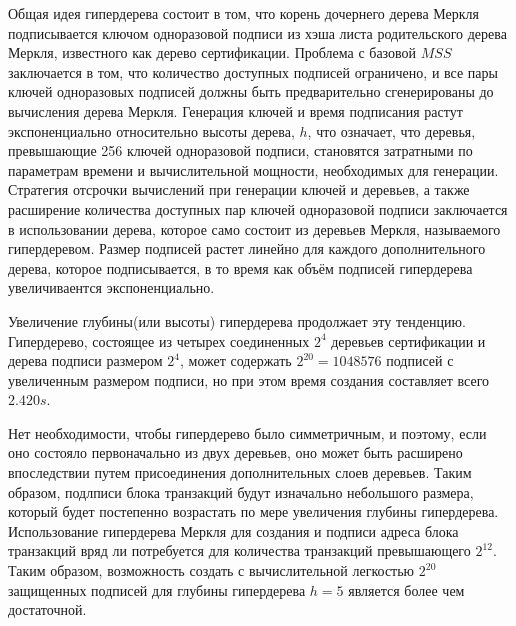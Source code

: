 \documentclass[a4paper, 14pt]{extarticle}
\begin{document}
Общая идея гипердерева состоит в том, что корень дочернего дерева Меркля подписывается ключом одноразовой подписи из хэша листа родительского дерева Меркля, известного как дерево сертификации. Проблема с базовой $MSS$ заключается в том, что количество доступных подписей ограничено, и все пары ключей одноразовых подписей должны быть предварительно сгенерированы до вычисления дерева Меркля. Генерация ключей и время подписания растут экспоненциально относительно высоты дерева, $h$, что означает, что деревья, превышающие 256 ключей одноразовой подписи, становятся затратными по параметрам времени и вычислительной мощности, необходимых для генерации. Стратегия отсрочки вычислений при генерации ключей и деревьев, а также расширение количества доступных пар ключей одноразовой подписи заключается в использовании дерева, которое само состоит из деревьев Меркля, называемого гипердеревом. Размер подписей растет линейно для каждого дополнительного дерева, которое подписывается, в то время как объём подписей гипердерева увеличиваентся экспоненциально.

Увеличение глубины(или высоты) гипердерева продолжает эту тенденцию. Гипердерево, состоящее из четырех соединенных $2^4$ деревьев сертификации и дерева подписи размером $2^4$, может содержать $2^{20} = 1 048 576$ подписей с увеличенным размером подписи, но при этом время создания составляет всего $2.420s$.

Нет необходимости, чтобы гипердерево было симметричным, и поэтому, если оно состояло первоначально из двух деревьев, оно может быть расширено впоследствии путем присоединения дополнительных слоев деревьев. Таким образом, подлписи блока транзакций будут изначально небольшого размера, который будет постепенно возрастать по мере увеличения глубины гипердерева. Использование гипердерева Меркля для создания и подписи адреса блока транзакций вряд ли потребуется для количества транзакций превышающего $2^{12}$. Таким образом, возможность создать с вычислительной легкостью $2^{20}$ защищенных подписей для глубины гипердерева $h = 5$ является более чем достаточной.
\newpage
\end{document}
